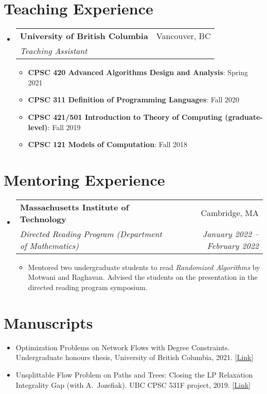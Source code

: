 \documentclass[letterpaper,11pt]{article}
\makeatletter
\newcommand{\resumeItem}[2]{
  \item\small{
    \textbf{#1}{: #2 \vspace{-2pt}}
  }
}
\newcommand{\researchItem}[1]{
  \item\small{#1 \vspace{-2pt}}
}
\newcommand{\manuscriptItem}[1]{
  \item #1 \vspace{-7pt}
}
\newcommand{\resumeSubheading}[4]{
  \vspace{-1pt}\item
    \begin{tabular*}{0.97\textwidth}{l@{\extracolsep{\fill}}r}
      \textbf{#1} & #2 \\
      \textit{\small#3} & \textit{\small #4} \\
    \end{tabular*}\vspace{-5pt}
}
\newcommand{\resumeSubHeadingListStart}{\begin{itemize}[leftmargin=*]}
\newcommand{\resumeSubHeadingListEnd}{\end{itemize}}
\newcommand{\resumeItemListStart}{\begin{itemize}}
\newcommand{\resumeItemListEnd}{\end{itemize}\vspace{-5pt}}
\makeatother
\begin{document}
\section{Teaching Experience}
  \resumeSubHeadingListStart
    \resumeSubheading
      {University of British Columbia}{Vancouver, BC}
      {Teaching Assistant}{}
      \resumeItemListStart
        \resumeItem{CPSC 420 Advanced Algorithms Design and Analysis}{Spring 2021}
        \resumeItem{CPSC 311 Definition of Programming Languages}{Fall 2020}
        \resumeItem{CPSC 421/501 Introduction to Theory of Computing (graduate-level)}{Fall 2019}
        \resumeItem{CPSC 121 Models of Computation}{Fall 2018}
      \resumeItemListEnd
  \resumeSubHeadingListEnd

\section{Mentoring Experience}
\resumeSubHeadingListStart
  \resumeSubheading
    {Massachusetts Institute of Technology}{Cambridge, MA}
    {Directed Reading Program (Department of Mathematics)}{January 2022 -- February 2022}
    \resumeItemListStart
      \researchItem{Mentored two undergraduate students to read \emph{Randomized Algorithms} by Motwani and Raghavan. Advised the students on the presentation in the directed reading program symposium.}
    \resumeItemListEnd
\resumeSubHeadingListEnd

\section{Manuscripts}
  \resumeSubHeadingListStart
    \manuscriptItem{Optimization Problems on Network Flows with Degree Constraints. Undergraduate
    honours thesis, University of British Columbia, 2021. [\href{https://ypan.me/docs/ug-thesis.pdf}{Link}]}
    \manuscriptItem{Unsplittable Flow Problem on Paths and Trees: Closing the LP Relaxation Integrality Gap (with A.\ Jozefiak). UBC CPSC 531F project, 2019. [\href{https://ypan.me/docs/ufp-survey.pdf}{Link}]}
  \resumeSubHeadingListEnd

\vspace{-5pt}
\end{document}
